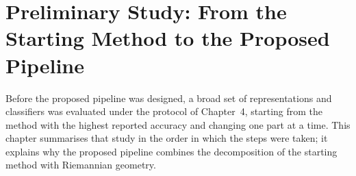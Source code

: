 \chapter{Preliminary Study: From the Starting Method to the Proposed Pipeline}
\thispagestyle{empty}

Before the proposed pipeline was designed, a broad set of representations and classifiers was
evaluated under the protocol of Chapter~4, starting from the method with the highest reported
accuracy and changing one part at a time. This chapter summarises that study in the order in
which the steps were taken; it explains why the proposed pipeline combines the decomposition of
the starting method with Riemannian geometry.

\newcommand{\stepres}[1]{\par\smallskip\noindent\hspace*{1.5em}$\rightarrow$\ \textit{Unseen
  people:} DS-2 \textbf{\R{Step#1DStwoBal}\%} balanced accuracy, \R{Step#1DStwoSubj} children
  correct; DS-1 rest \R{Step#1DSoneRestBal}\%, \R{Step#1DSoneRestSubj} participants correct.\par
  \medskip}

